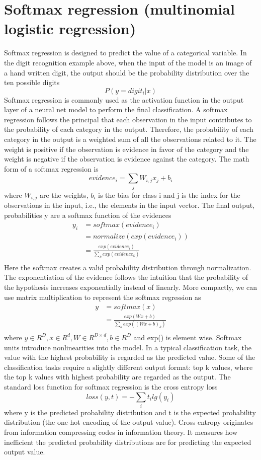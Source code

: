 \documentclass[12pt]{WSUThesis}
\theoremstyle{definition}
\begin{document}
\section{Softmax regression (multinomial logistic regression)}
Softmax regression is designed to predict the value of a categorical variable.
In the digit recognition example above, when the input of the model is an image of a hand written digit,
the output should be the probability distribution over the ten possible digits
\[P(y = digit_i | x)\]
Softmax regression is commonly used as the activation function in the output layer of a neural net model to perform the final classification.
A softmax regression follows the principal that each observation in the input contributes to the probability of each category in the output. Therefore, the probability of each category in the output is a weighted sum of all the observations related to it. The weight is positive if the observation is evidence in favor of the category and the weight is negative if the observation is evidence against the category.
The math form of a softmax regression is
\[ evidence_i = \sum_j W_{i, j} x_j + b_i \]
where $ W_{i,j} $ are the weights, $ b_i $ is the bias for class i and j is the index for the observations in the input, i.e., the elements in the input vector.
The final output, probabilities y are a softmax function of the evidences
\begin{align*}
y_i
&= softmax(evidence_i) \\
&= normalize(exp(evidence_i)) \\
&= \frac{exp(evidence_i)}{\sum_k exp(evidence_k)} \\
\end{align*}
Here the softmax creates a valid probability distribution through normalization.
The exponentiation of the evidence follows the intuition that the probability of the hypothesis increases exponentially instead of linearly.
More compactly, we can use matrix multiplication to represent the softmax regression as
\begin{align*}
y
&= softmax(x) \\
&= \frac{exp(Wx + b)}{\sum_k exp((Wx + b)_k)} \\
\end{align*}
where $ y \in R^D, x \in R^d, W \in R^{D \times d}, b \in R^D $ and exp() is element wise.
Softmax units introduce nonlinearities into the model.
In a typical classification task, the value with the highest probability is regarded as the predicted value.
Some of the classification tasks require a slightly different output format: top k values, where the top k values with highest probability are regarded as the output.
The standard loss function for softmax regression is the cross entropy loss
\[loss(y, t) = - \sum_i t_i lg(y_i)\]
where y is the predicted probability distribution and t is the expected probability distribution (the one-hot encoding of the output value).
Cross entropy originates from information compressing codes in information theory.
It measures how inefficient the predicted probability distributions are for predicting the expected output value.
\end{document}
